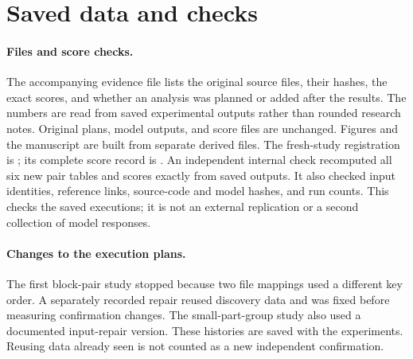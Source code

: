 \documentclass[11pt]{article}
\begin{document}
\begin{table}[htbp]
\centering\footnotesize
\caption{Ranking direct links on new inputs after first choosing parts.
``Best EAP'' is the best-scoring specified EAP version for that model.
Neither case passes the full planned test.}
\label{tab:directed}

\end{table}

\section{Saved data and checks}
\paragraph{Files and score checks.}
The accompanying evidence file lists the original source files, their hashes,
the exact scores, and whether an analysis was planned or added after the
results. The numbers are read from saved experimental outputs rather than
rounded research notes. Original plans, model outputs, and score files are
unchanged. Figures and the manuscript are built from separate derived files.
The fresh-study registration is
;
its complete score record is
.
An independent internal check recomputed all six new pair tables and scores
exactly from saved outputs. It also checked input identities, reference links,
source-code and model hashes, and run counts. This checks the saved executions;
it is not an external replication or a second collection of model responses.

\paragraph{Changes to the execution plans.}
The first block-pair study stopped because two file mappings used a different
key order. A separately recorded repair reused discovery data and was fixed
before measuring confirmation changes. The small-part-group study also used a
documented input-repair version. These histories are saved with the experiments.
Reusing data already seen is not counted as a new independent confirmation.



\end{document}
